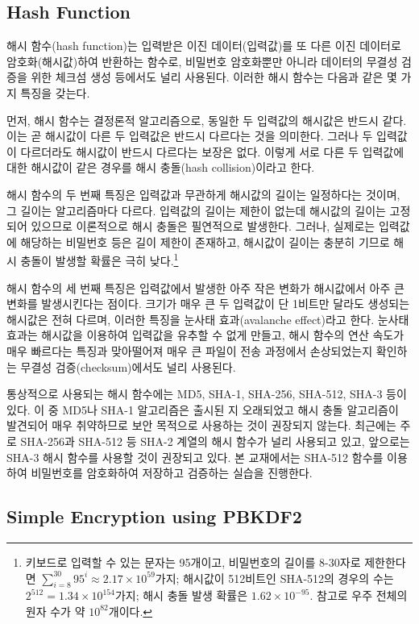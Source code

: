 \subsection*{Hash Function}

해시 함수(hash function)는 입력받은 이진 데이터(입력값)를 또 다른 이진 데이터로 암호화(해시값)하여 반환하는 함수로, 비밀번호 암호화뿐만 아니라 데이터의 무결성 검증을 위한 체크섬 생성 등에서도 널리 사용된다. 이러한 해시 함수는 다음과 같은 몇 가지 특징을 갖는다.

먼저, 해시 함수는 결정론적 알고리즘으로, 동일한 두 입력값의 해시값은 반드시 같다. 이는 곧 해시값이 다른 두 입력값은 반드시 다르다는 것을 의미한다. 그러나 두 입력값이 다르더라도 해시값이 반드시 다르다는 보장은 없다. 이렇게 서로 다른 두 입력값에 대한 해시값이 같은 경우를 해시 충돌(hash collision)이라고 한다.

해시 함수의 두 번째 특징은 입력값과 무관하게 해시값의 길이는 일정하다는 것이며, 그 길이는 알고리즘마다 다르다. 입력값의 길이는 제한이 없는데 해시값의 길이는 고정되어 있으므로 이론적으로 해시 충돌은 필연적으로 발생한다. 그러나, 실제로는 입력값에 해당하는 비밀번호 등은 길이 제한이 존재하고, 해시값이 길이는 충분히 기므로 해시 충돌이 발생할 확률은 극히 낮다.\footnote{키보드로 입력할 수 있는 문자는 95개이고, 비밀번호의 길이를 8-30자로 제한한다면 $\sum_{i=8}^{30}95^i\approx 2.17\times 10^{59}$가지; 해시값이 512비트인 SHA-512의 경우의 수는 $2^{512}=1.34\times 10^{154}$가지; 해시 충돌 발생 확률은 $1.62\times 10^{-95}$. 참고로 우주 전체의 원자 수가 약 $10^{82}$개이다.}

해시 함수의 세 번째 특징은 입력값에서 발생한 아주 작은 변화가 해시값에서 아주 큰 변화를 발생시킨다는 점이다. 크기가 매우 큰 두 입력값이 단 1비트만 달라도 생성되는 해시값은 전혀 다르며, 이러한 특징을 눈사태 효과(avalanche effect)라고 한다. 눈사태 효과는 해시값을 이용하여 입력값을 유추할 수 없게 만들고, 해시 함수의 연산 속도가 매우 빠르다는 특징과 맞아떨어져 매우 큰 파일이 전송 과정에서 손상되었는지 확인하는 무결성 검증(checksum)에서도 널리 사용된다.

통상적으로 사용되는 해시 함수에는 MD5, SHA-1, SHA-256, SHA-512, SHA-3 등이 있다. 이 중 MD5나 SHA-1 알고리즘은 출시된 지 오래되었고 해시 충돌 알고리즘이 발견되어 매우 취약하므로 보안 목적으로 사용하는 것이 권장되지 않는다. 최근에는 주로 SHA-256과 SHA-512 등 SHA-2 계열의 해시 함수가 널리 사용되고 있고, 앞으로는 SHA-3 해시 함수를 사용할 것이 권장되고 있다. 본 교재에서는 SHA-512 함수를 이용하여 비밀번호를 암호화하여 저장하고 검증하는 실습을 진행한다.

\subsection*{Simple Encryption using PBKDF2}

